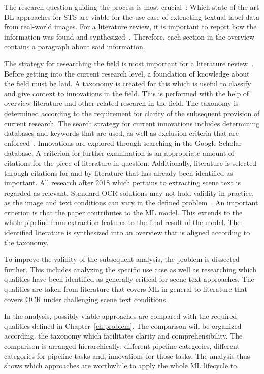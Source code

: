 The research question guiding the process is most crucial~\citep{snyder_literature_2019}:
Which state of the art \ac{DL} approaches for \ac{STS} are viable for the use case of extracting
textual label data from real-world images.
For a literature review, it is important to report how the information was found and
synthesized~\citep{torraco_writing_2005}.
Therefore, each section in the overview contains a paragraph about said information.

The strategy for researching the field is most important for a literature
review~\citep{snyder_literature_2019}.
Before getting into the current research level, a foundation of knowledge about the field must be
laid.
A taxonomy is created for this which is useful to classify and give context to innovations in the
field.
This is performed with the help of overview literature and other related research in the field.
The taxonomy is determined according to the requirement for clarity of the subsequent provision of
current research.
The search strategy for current innovations includes determining databases and keywords that are
used, as well as exclusion criteria that are enforced~\citep{torraco_writing_2005}.
Innovations are explored through searching in the Google Scholar database.
A criterion for further examination is an appropriate amount of citations for the piece of literature
in question.
Additionally, literature is selected through citations for and by literature that has already been
identified as important.
All research after 2018 which pertains to extracting scene text is regarded as relevant.
Standard \ac{OCR} solutions may not hold validity in practice, as the image and text conditions can
vary in the defined problem~\citep{chen_text_2021}.
An important criterion is that the paper contributes to the \ac{ML} model.
This extends to the whole pipeline from extraction features to the final result of the model.
The identified literature is synthesized into an overview that is aligned according to the taxonomy.

To improve the validity of the subsequent analysis, the problem is dissected further.
This includes analyzing the specific use case as well as researching which qualities have been
identified as generally critical for scene text approaches.
The qualities are taken from literature that covers \ac{ML} in general to literature
that covers \ac{OCR} under challenging scene text conditions.

In the analysis, possibly viable approaches are compared with the required qualities defined
in Chapter~\ref{ch:problem}.
The comparison will be organized according, the taxonomy which facilitates clarity and
comprehensibility.
The comparison is arranged hierarchically: different pipeline categories,
different categories for pipeline tasks and, innovations for those tasks.
The analysis thus shows which approaches are worthwhile to apply the whole \ac{ML} lifecycle to.

